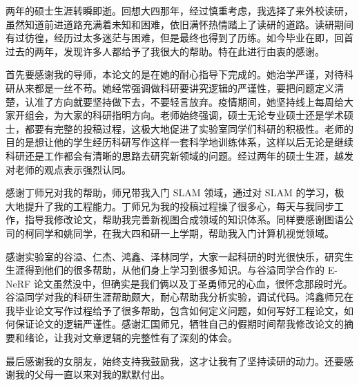 
\begin{acknowledgements}
  两年的硕士生涯转瞬即逝。回想大四那年，经过慎重考虑，我选择了来外校读研，虽然知道前进道路充满着未知和困难，依旧满怀热情踏上了读研的道路。读研期间有过彷徨，经历过太多迷茫与困难，但是最终也得到了历练。如今毕业在即，回首过去的两年，发现许多人都给予了我很大的帮助。特在此进行由衷的感谢。
  
  首先要感谢我的导师，本论文的是在她的耐心指导下完成的。她治学严谨，对待科研从来都是一丝不苟。她经常强调做科研要讲究逻辑的严谨性，要把问题定义清楚，认准了方向就要坚持做下去，不要轻言放弃。疫情期间，她坚持线上每周给大家开组会，为大家的科研指明方向。老师始终强调，硕士无论专业硕士还是学术硕士，都要有完整的投稿过程，这极大地促进了实验室同学们科研的积极性。老师的目的是想让他的学生经历科研写作这样一套科学地训练体系，这样以后无论是继续科研还是工作都会有清晰的思路去研究新领域的问题。经过两年的硕士生涯，越发对老师的观点表示强烈认同。
  
  感谢丁师兄对我的帮助，师兄带我入门 SLAM 领域，通过对 SLAM 的学习，极大地提升了我的工程能力。丁师兄为我的投稿过程操了很多心，每天与我同步工作，指导我修改论文，帮助我完善新视图合成领域的知识体系。同样要感谢图语公司的柯同学和姚同学，在我大四和研一上学期，帮助我入门计算机视觉领域。
  
  感谢实验室的谷溢、仁杰、鸿鑫、泽林同学，大家一起科研的时光很快乐，研究生生涯得到他们的很多帮助，从他们身上学习到很多知识。与谷溢同学合作的 E-NeRF 论文虽然没中，但确实是我们俩以及丁圣勇师兄的心血，很怀念那段时光。谷溢同学对我的科研生涯帮助颇大，耐心帮助我分析实验，调试代码。鸿鑫师兄在我毕业论文写作过程给予了很多帮助，包含如何定义问题，如何写好工程论文，如何保证论文的逻辑严谨性。感谢汇国师兄，牺牲自己的假期时间帮我修改论文的摘要和绪论，让我对文章逻辑的完整性有了深刻的体会。
  
  最后感谢我的女朋友，始终支持我鼓励我，这才让我有了坚持读研的动力。还要感谢我的父母一直以来对我的默默付出。
\end{acknowledgements}
